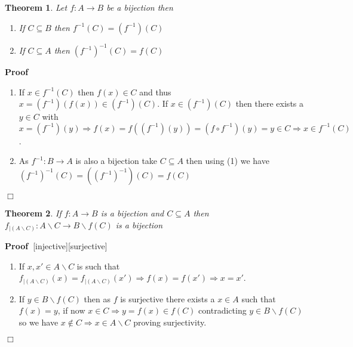 \documentclass{book}
\newcommand{\nin}{\not\in}
\newenvironment{proof}{\noindent\textbf{Proof\ }}{\hspace*{\fill}$\Box$\medskip}
\newtheorem{theorem}{Theorem}
\begin{document}
{{\begin{theorem}
  \label{preimage of a bijection}Let $f : A \rightarrow B$ be a bijection then
  \begin{enumerate}
    \item If $C \subseteq B$ then $f^{- 1} (C) = (f^{- 1}) (C)$
    
    \item If $C \subseteq A$ then $(f^{- 1})^{- 1} (C) = f (C)$
  \end{enumerate}
\end{theorem}

\begin{proof}
  
  \begin{enumerate}
    \item If $x \in f^{- 1} (C)$ then $f (x) \in C$ and thus $x = (f^{- 1}) (f
    (x)) \in (f^{- 1}) (C)$. If $x \in (f^{- 1}) (C)$ then there exists a $y
    \in C$ with $x = (f^{- 1}) (y) \Rightarrow f (x) = f ((f^{- 1}) (y)) = (f
    \circ f^{- 1}) (y) = y \in C \Rightarrow x \in f^{- 1} (C)$.
    
    \item As $f^{- 1} : B \rightarrow A$ is also a bijection take $C \subseteq
    A$ then using (1) we have $(f^{- 1})^{- 1} (C) = ((f^{- 1})^{- 1}) (C) = f
    (C)$
  \end{enumerate}
\end{proof}

\begin{theorem}
  \label{bijections and exclusions}If $f : A \rightarrow B$ is a bijection and
  $C \subseteq A$ then $f_{| (A \backslash C)} : A \backslash C \rightarrow B
  \backslash f (C)$ is a bijection
\end{theorem}

\begin{proof}[injective][surjective]
  
  \begin{enumerate}
    \item If $x, x' \in A \backslash C$ is such that $f_{| (A \backslash C)}
    (x) = f_{| (A \backslash C)} (x') \Rightarrow f (x) = f (x') \Rightarrow x
    = x'$.
    
    \item If $y \in B \backslash f (C)$ then as $f$ is surjective there exists
    a $x \in A$ such that $f (x) = y$, if now $x \in C \Rightarrow y = f (x)
    \in f (C)$ contradicting $y \in B \backslash f (C)$ so we have $x \nin C
    \Rightarrow x \in A \backslash C$ proving surjectivity.
  \end{enumerate}
\end{proof}

}}
\end{document}
